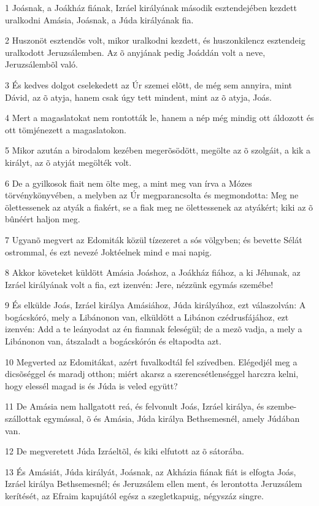 \par 1 Joásnak, a Joákház fiának, Izráel királyának második esztendejében kezdett uralkodni Amásia, Joásnak, a Júda királyának fia.
\par 2 Huszonöt esztendõs volt, mikor uralkodni kezdett, és huszonkilencz esztendeig uralkodott Jeruzsálemben. Az õ anyjának pedig Joáddán volt a neve, Jeruzsálembõl való.
\par 3 És kedves dolgot cselekedett az Úr szemei elõtt, de még sem annyira, mint Dávid, az õ atyja, hanem csak úgy tett mindent, mint az õ atyja, Joás.
\par 4 Mert a magaslatokat nem rontották le, hanem a nép még mindig ott áldozott és ott tömjénezett a magaslatokon.
\par 5 Mikor azután a birodalom kezében megerõsödött, megölte az õ szolgáit, a kik a királyt, az õ atyját megölték volt.
\par 6 De a gyilkosok fiait nem ölte meg, a mint meg van írva a Mózes törvénykönyvében, a melyben az Úr megparancsolta és megmondotta: Meg ne ölettessenek az atyák a fiakért, se a fiak meg ne ölettessenek az atyákért; kiki az õ bûnéért haljon meg.
\par 7 Ugyanõ megvert az Edomiták közül tízezeret a sós völgyben; és bevette Sélát ostrommal, és ezt nevezé Joktéelnek mind e mai napig.
\par 8 Akkor követeket küldött Amásia Joáshoz, a Joákház fiához, a ki Jéhunak, az Izráel királyának volt a fia, ezt izenvén: Jere, nézzünk egymás szemébe!
\par 9 És elkülde Joás, Izráel királya Amásiához, Júda királyához, ezt válaszolván: A bogácskóró, mely a Libánonon van, elküldött a Libánon czédrusfájához, ezt izenvén: Add a te leányodat az én fiamnak feleségül; de a mezõ vadja, a mely a Libánonon van, átszaladt a bogácskórón és eltapodta azt.
\par 10 Megverted az Edomitákat, azért fuvalkodtál fel szívedben. Elégedjél meg a dicsõséggel és maradj otthon; miért akarsz a szerencsétlenséggel harczra kelni, hogy elessél magad is és Júda is veled együtt?
\par 11 De Amásia nem hallgatott reá, és felvonult Joás, Izráel királya, és szembe-szállottak egymással, õ és Amásia, Júda királya Bethsemesnél, amely Júdában van.
\par 12 De megveretett Júda Izráeltõl, és kiki elfutott az õ sátorába.
\par 13 És Amásiát, Júda királyát, Joásnak, az Akházia fiának fiát is elfogta Joás, Izráel királya Bethsemesnél; és Jeruzsálem ellen ment, és lerontotta Jeruzsálem kerítését, az Efraim kapujától egész a szegletkapuig, négyszáz singre.
